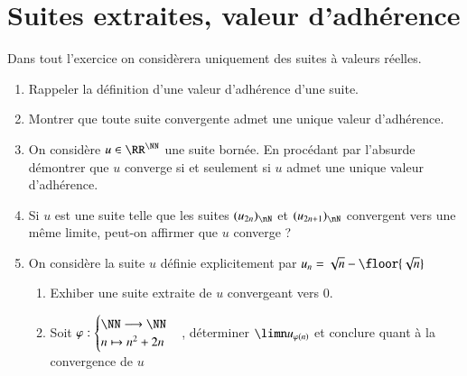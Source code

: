 \documentclass[oneside,12pt]{article}
\let\oldsection\section
\renewcommand{\section}{\newpage\oldsection}
\begin{document}
\section{Suites extraites, valeur d'adhérence}
Dans tout l'exercice on considèrera uniquement des suites à valeurs réelles.

\begin{enumerate}
	\item Rappeler la définition d'une valeur d'adhérence d'une suite.
	\item Montrer que toute suite convergente admet une unique valeur d'adhérence.
	\item On considère $u\in\RR^{\NN}$ une suite bornée. En procédant par l'absurde démontrer que $u$ converge si et seulement si $u$ admet une unique valeur d'adhérence.
	\item Si $u$ est une suite telle que les suites $(u_{2n})_{\nN}$ et $(u_{2n+1})_{\nN}$ convergent vers une même limite, peut-on affirmer que $u$ converge ?
	\item On considère la suite $u$ définie explicitement par $u_n=\sqrt{n}-\floor{\sqrt{n}}$	
	\begin{enumerate}
		\item Exhiber une suite extraite de $u$ convergeant vers $0$.
		\item Soit $\varphi : \begin{cases} \NN \longrightarrow \NN \\ n\mapsto n^2+2n \end{cases}$, déterminer $\limn u_{\varphi(n)}$ et conclure quant à la convergence de $u$
	\end{enumerate}	 
\end{enumerate}

\vspace{2cm}


\vspace{1cm}
\end{document}
